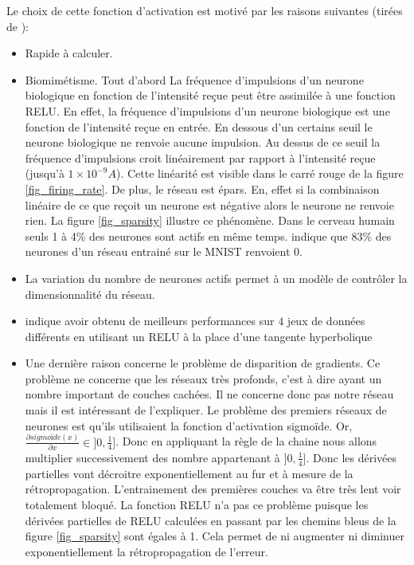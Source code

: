 \documentclass[a4paper,11pt,oneside,roman]{article}
\begin{document}
    Le choix de cette fonction d'activation est motivé par les raisons suivantes (tirées de \cite{pmlr-v15-glorot11a}):
    \begin{itemize}
        \item Rapide à calculer.
        \item Biomimétisme. Tout d'abord La fréquence d'impulsions d'un neurone biologique en fonction de l'intensité reçue peut être assimilée à une fonction RELU.
        En effet, la fréquence d'impulsions d'un neurone biologique est une fonction de l'intensité reçue en entrée. 
        En dessous d'un certains seuil le neurone biologique ne renvoie aucune impulsion.
        Au dessus de ce seuil la fréquence d'impulsions croit linéairement par rapport à l'intensité reçue (jusqu'à $1\times 10^{-9} A$). Cette linéarité est visible dans le carré rouge de la figure \ref{fig_firing_rate}.
        De plus, le réseau est épars. En, effet si la combinaison linéaire de ce que reçoit un neurone est négative alors le neurone ne renvoie rien.
        La figure \ref{fig_sparsity} illustre ce phénomène. Dans le cerveau humain seuls 1 à 4\% des neurones sont actifs en même temps.
        \cite{pmlr-v15-glorot11a} indique que $83\%$ des neurones d'un réseau entrainé sur le MNIST renvoient $0$. 
        \item La variation du nombre de neurones actifs permet à un modèle de contrôler la dimensionnalité du réseau.
        \item \cite{pmlr-v15-glorot11a} indique avoir obtenu de meilleurs performances sur $4$ jeux de données différents en utilisant un RELU à la place d'une tangente hyperbolique
        \item Une dernière raison concerne le problème de disparition de gradients.
        Ce problème ne concerne que les réseaux très profonds, c'est à dire ayant un nombre important de couches cachées.
        Il ne concerne donc pas notre réseau mais il est intéressant de l'expliquer.
        Le problème des premiers réseaux de neurones est qu'ils utilisaient la fonction d'activation sigmoïde. Or, $\frac{\partial sigmoïde(x)}{\partial x}\in ]0,\frac{1}{4}]$.
        Donc en appliquant la règle de la chaine nous allons multiplier successivement des nombre appartenant à $]0,\frac{1}{4}]$.
        Donc les dérivées partielles vont décroitre exponentiellement au fur et à mesure de la rétropropagation.
        L'entrainement des premières couches va être très lent voir totalement bloqué.
        La fonction RELU n'a pas ce problème puisque les dérivées partielles de RELU calculées en passant par les chemins bleus de la figure \ref{fig_sparsity} sont égales à 1.
        Cela permet de ni augmenter ni diminuer exponentiellement la rétropropagation de l'erreur.
    \end{itemize}
\end{document}
